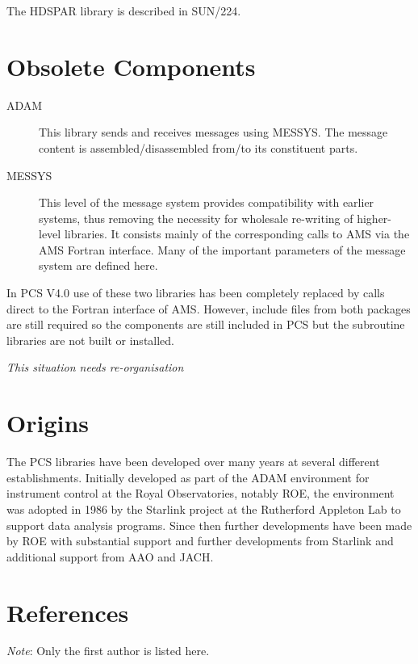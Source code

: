 \documentclass[twoside,11pt]{article}
\newcommand{\htmladdnormallink}[2]{#1}
\newcommand{\xref}[3]{#1}
\newcommand{\xlabel}[1]{}
\renewcommand{\_}{\texttt{\symbol{95}}}
\newcommand{\ROEURL}{http://www.roe.ac.uk/}
\newcommand{\STARURL}{http://www.starlink.ac.uk/}
\newcommand{\RALURL}{http://www.clrc.ac.uk/}
\newcommand{\AAOURL}{http://www.aao.gov.au/}
\newcommand{\JACHURL}{http://www.jach.hawaii.edu/}
\begin{document}
The HDSPAR library is described in
\xref{SUN/224}{sun224}{}.

\section{\xlabel{obsolete_components}Obsolete Components}

\begin{description}
\item[ADAM] This library sends and receives messages using MESSYS.
The message content is assembled/disassembled from/to its constituent parts.
\item[MESSYS] This level of the message system provides compatibility with
earlier systems, thus removing the necessity for wholesale re-writing of
higher-level libraries. It consists mainly of the corresponding calls to AMS
via the AMS Fortran interface. Many of the important parameters of the message
system are defined here.
\end{description}

In PCS V4.0 use of these two libraries has been completely replaced by
calls direct to the Fortran interface of AMS. However, include files from both
packages are still required so the components are still included in PCS but
the subroutine libraries are not built or installed.

\emph{This situation needs re-organisation}

\section{\xlabel{origins}Origins}
The PCS libraries have been developed over many years at several different
establishments. Initially developed as part of the ADAM environment for
instrument control at the Royal Observatories, notably
\htmladdnormallink{ROE}{\ROEURL},
the environment was adopted in 1986 by the
\htmladdnormallink{Starlink}{\STARURL}
project at the
\htmladdnormallink{Rutherford Appleton Lab}{\RALURL}
to support data analysis programs.
Since then further developments have been made by ROE with substantial support
and further developments from Starlink and additional support from
\htmladdnormallink{AAO}{\AAOURL}
and
\htmladdnormallink{JACH}{\JACHURL}.

\section{\xlabel{references}References}
{\em Note}: Only the first author is listed here.
\end{document}
